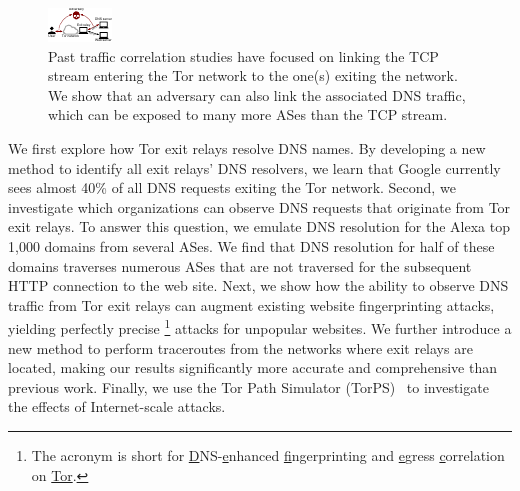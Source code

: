 \begin{figure}[t]
	\centering
	\includegraphics[width=0.65\linewidth]{figures/attack-concept.pdf}
	\caption{Past traffic correlation studies have focused on linking the TCP
		stream entering the Tor network to the one(s) exiting the network.  We
		show that an adversary can also link the associated DNS traffic, which
		can be exposed to many more ASes than the TCP stream.}
	\label{fig:overview}
\end{figure}

We first explore how Tor exit relays resolve DNS names.  By developing a new
method to identify all exit relays' DNS resolvers, we learn that Google
currently sees almost 40\% of all DNS requests exiting the Tor network.  Second,
we investigate which organizations can observe DNS requests that originate from
Tor exit relays.  To answer this question, we emulate DNS resolution for the
Alexa top 1,000 domains from several ASes.
We find that DNS resolution for half of these domains traverses numerous
ASes that are not traversed for the subsequent HTTP connection to the web site.  
Next, we show how the ability to observe DNS 
traffic from Tor exit relays can augment existing website fingerprinting
attacks, yielding perfectly precise \name\footnote{The acronym is short for
\underline{D}NS-\underline{e}nhanced \underline{f}ingerprinting and
\underline{e}gress \underline{c}orrelation on \underline{Tor}.} attacks for
unpopular websites.  
We further introduce a new method to perform traceroutes from the networks where
exit relays are located, making our results significantly more accurate and
comprehensive than previous work.  
Finally, we use the Tor Path Simulator (TorPS)~\cite{TorPS} 
to investigate the effects of Internet-scale \name attacks. 

